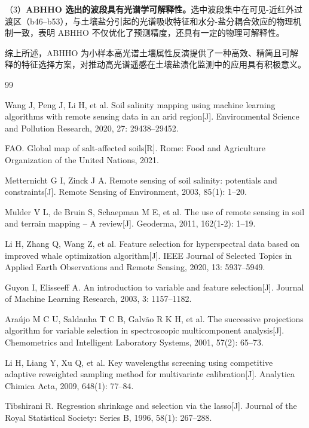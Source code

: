 \documentclass[12pt,a4paper]{article}
\begin{document}
（3）\textbf{ABHHO 选出的波段具有光谱学可解释性。}选中波段集中在可见-近红外过渡区（b46--b53），与土壤盐分引起的光谱吸收特征和水分-盐分耦合效应的物理机制一致，表明 ABHHO 不仅优化了预测精度，还具有一定的物理可解释性。

综上所述，ABHHO 为小样本高光谱土壤属性反演提供了一种高效、精简且可解释的特征选择方案，对推动高光谱遥感在土壤盐渍化监测中的应用具有积极意义。


\begin{thebibliography}{99}

Wang J, Peng J, Li H, et al.
Soil salinity mapping using machine learning algorithms with remote sensing data in an arid region[J].
Environmental Science and Pollution Research, 2020, 27: 29438--29452.

FAO.
Global map of salt-affected soils[R].
Rome: Food and Agriculture Organization of the United Nations, 2021.

Metternicht G I, Zinck J A.
Remote sensing of soil salinity: potentials and constraints[J].
Remote Sensing of Environment, 2003, 85(1): 1--20.

Mulder V L, de Bruin S, Schaepman M E, et al.
The use of remote sensing in soil and terrain mapping -- A review[J].
Geoderma, 2011, 162(1-2): 1--19.

Li H, Zhang Q, Wang Z, et al.
Feature selection for hyperspectral data based on improved whale optimization algorithm[J].
IEEE Journal of Selected Topics in Applied Earth Observations and Remote Sensing, 2020, 13: 5937--5949.

Guyon I, Elisseeff A.
An introduction to variable and feature selection[J].
Journal of Machine Learning Research, 2003, 3: 1157--1182.

Araújo M C U, Saldanha T C B, Galvão R K H, et al.
The successive projections algorithm for variable selection in spectroscopic multicomponent analysis[J].
Chemometrics and Intelligent Laboratory Systems, 2001, 57(2): 65--73.

Li H, Liang Y, Xu Q, et al.
Key wavelengths screening using competitive adaptive reweighted sampling method for multivariate calibration[J].
Analytica Chimica Acta, 2009, 648(1): 77--84.

Tibshirani R.
Regression shrinkage and selection via the lasso[J].
Journal of the Royal Statistical Society: Series B, 1996, 58(1): 267--288.


\end{thebibliography}
\end{document}
